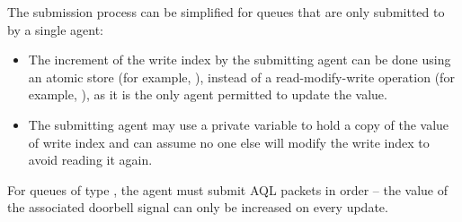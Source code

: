 \documentclass[oneside]{book}
\begin{document}
The submission process can be simplified for queues that are only submitted to
by a single agent:
\begin{itemize}[itemsep=1pt,topsep=3pt,partopsep=0pt]
\item The increment of the write index by the submitting agent can be done using
  an atomic store (for example, ),
  instead of a read-modify-write operation (for example,
  ), as it is the only agent
  permitted to update the value.
\item The submitting agent may use a private variable to hold a copy of the
  value of write index and can assume no one else will modify the write index to
  avoid reading it again.
\end{itemize}

For queues of type , the agent must submit
AQL packets in order -- the value of the associated doorbell signal can only be
increased on every update.



\end{document}
